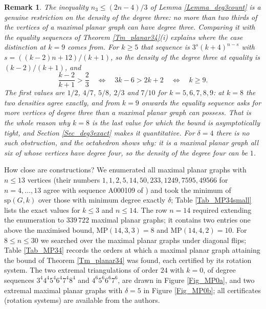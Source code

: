 \documentclass[10pt,a4paper]{article}
\newtheorem{remark}[theorem]{Remark}
\begin{document}
\begin{remark}
\label{Rem_peel}The inequality $n_{3}\leq (2n-4)/3$ of Lemma \ref{Lemma_deg3count} is a genuine
restriction on the density of the degree
three: no more than two thirds of the vertices of a maximal planar graph can have
degree three. Comparing it with the equality sequences of Theorem
\ref{Tm_planar34}(i) explains where the case distinction at $k=9$ comes from.
For $k\geq 5$ that sequence is $3^{s}(k+4)^{n-s}$ with $s=((k-2)n+12)/(k+1)$, so
the density of the degree three at equality is $(k-2)/(k+1)$, and
\[
\frac{k-2}{k+1}>\frac{2}{3}\quad \Longleftrightarrow \quad 3k-6>2k+2\quad
\Longleftrightarrow \quad k\geq 9.
\]
The first values are $1/2$, $4/7$, $5/8$, $2/3$ and $7/10$ for
$k=5,6,7,8,9$: at $k=8$ the two densities agree exactly, and from $k=9$ onwards
the equality sequence asks for more vertices of degree three than a
maximal planar graph can possess. That is the whole reason why $k=8$ is the last value
for which the bound is asymptotically tight, and Section \ref{Sec_deg3exact}
makes it quantitative. For $\delta =4$ there is no such obstruction, and the
octahedron shows why: it is a maximal planar graph all six of whose vertices have
degree four, so the density of the degree four can be $1$.
\end{remark}



How close are constructions? We enumerated all maximal planar graphs with $n\leq 13$ vertices
(their numbers $1,1,2,5,14,50,233,1249,7595,49566$ for $n=4,\ldots ,13$ agree with sequence
A000109 of \cite{OEIS}) and took the minimum of $\mathrm{sp}(G,k)$ over those with minimum degree
exactly $\delta $; Table \ref{Tab_MP34small} lists the exact values for $k\leq 3$ and $n\leq 14$. The row $n=14$ required extending the
enumeration to $339\,722$ maximal planar graphs; it contains two entries one above the maximised bound,
$\mathrm{MP}(14,3,3)=8$ and $\mathrm{MP}(14,4,2)=10$. For
$8\leq n\leq 30$ we searched over the maximal planar graphs under diagonal flips; Table \ref{Tab_MP34}
records the orders at which a maximal planar graph attaining the bound of Theorem \ref{Tm_planar34} was
found, each certified by its rotation system. The two extremal triangulations of order $24$ with
$k=0$, of degree sequences $3^{4}4^{4}5^{4}6^{4}7^{4}8^{4}$ and $4^{6}5^{6}6^{6}7^{6}$, are drawn in Figure
\ref{Fig_MP0a}, and two extremal maximal planar graphs with $\delta =5$ in Figure \ref{Fig_MP0b}; all certificates
(rotation systems) are
available from the authors.
\end{document}
